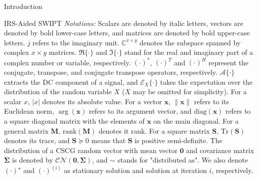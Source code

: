 \documentclass[journal]{IEEEtran}
\begin{document}
\begin{section}{Introduction}
\begin{subsection}{IRS-Aided SWIPT}
			\textit{Notations:} Scalars are denoted by italic letters, vectors are denoted by bold lower-case letters, and matrices are denoted by bold upper-case letters. $j$ refers to the imaginary unit. $\mathbb{C}^{x \times y}$ denotes the subspace spanned by complex $x \times y$ matrices. $\Re\{\cdot\}$ and $\Im\{\cdot\}$ stand for the real and imaginary part of a complex number or variable, respectively. $(\cdot)^*$, $(\cdot)^T$ and $(\cdot)^H$ represent the conjugate, transpose, and conjugate transpose operators, respectively. $\mathcal{A}\{\cdot\}$ extracts the DC component of a signal, and $\mathcal{E}_X\{\cdot\}$ takes the expectation over the distribution of the random variable $X$ ($X$ may be omitted for simplicity). For a scalar $x$, $\lvert{x}\rvert$ denotes its absolute value. For a vector $\boldsymbol{x}$, $\lVert{\boldsymbol{x}}\rVert$ refers to its Euclidean norm, $\arg(\boldsymbol{x})$ refers to its argument vector, and $\mathrm{diag}(\boldsymbol{x})$ refers to a square diagonal matrix with the elements of $\boldsymbol{x}$ on the main diagonal. For a general matrix $\boldsymbol{M}$, $\mathrm{rank}(\boldsymbol{M})$ denotes it rank. For a square matrix $\boldsymbol{S}$, $\mathrm{Tr}(\boldsymbol{S})$ denotes its trace, and $\boldsymbol{S} \succeq 0$ means that $\boldsymbol{S}$ is positive semi-definite. The distribution of a CSCG random vector with mean vector $\boldsymbol{0}$ and covariance matrix $\boldsymbol{\Sigma}$ is denoted by $\mathcal{CN}(\boldsymbol{0},\boldsymbol{\Sigma})$, and $\sim$ stands for "distributed as". We also denote $(\cdot)^{\star}$ and $(\cdot)^{(i)}$ as stationary solution and solution at iteration $i$, respectively.
		\end{subsection}
	\end{section}
\end{document}
